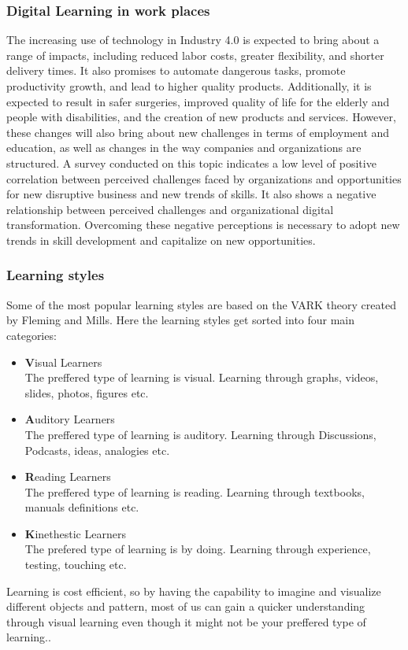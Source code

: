 \subsubsection{Digital Learning in work places}\label{subsec:digitalLearningWorkPlaces}

The increasing use of technology in Industry 4.0 is expected to bring about a range of impacts, including reduced labor costs, greater flexibility, and shorter delivery times. It also promises to automate dangerous tasks, promote productivity growth, and lead to higher quality products.
Additionally, it is expected to result in safer surgeries, improved quality of life for the elderly and people with disabilities, and the creation of new products and services. However, these changes will also bring about new challenges in terms of employment and education, as well as changes in the way companies and organizations are structured.
A survey conducted on this topic indicates a low level of positive correlation between perceived challenges faced by organizations and opportunities for new disruptive business and new trends of skills.
It also shows a negative relationship between perceived challenges and organizational digital transformation. Overcoming these negative perceptions is necessary to adopt new trends in skill development and capitalize on new opportunities.\cite{SkillsDigitalLearning}
\subsubsection{Learning styles}
Some of the most popular learning styles are based on the VARK theory\cite{vark} created by Fleming and Mills. Here the learning styles get sorted into four main categories:
\begin{itemize}
\item \textbf{V}isual Learners \\
The preffered type of learning is visual. Learning through graphs, videos, slides, photos, figures etc.
\item \textbf{A}uditory Learners\\
The preffered type of learning is auditory. Learning through Discussions, Podcasts, ideas, analogies etc.
\item \textbf{R}eading Learners\\
The preffered type of learning is reading. Learning through textbooks, manuals definitions etc.
\item \textbf{K}inethestic Learners \\
The prefered type of learning is by doing. Learning through experience, testing, touching etc.
\end{itemize}
Learning is cost efficient, so by having the capability to imagine and visualize different objects and pattern, most of us can gain a quicker understanding through visual learning even though it might not be your preffered type of learning.\cite{pracpsych2022}.

